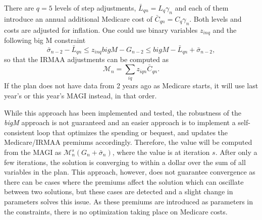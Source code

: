 \documentclass{report}[fleqn,12pt]
\begin{document}
\begin{description}[leftmargin=4em,style=multiline]
	There are $q=5$ levels
	of step adjustments, $\bar{L}_{qn} = L_q\gamma_n$ and each of them introduce
	an annual additional Medicare
	cost of $\bar{C}_{qn} = C_q\gamma_n$. Both levels and costs are adjusted for inflation.
	One could use binary variables $z_{inq}$ and the following big M constraint
	\begin{equation}
		\bar{\sigma}_{n-2} -\bar{L}_{qn} \le z_{inq} bigM - G_{n-2} \le bigM - \bar{L}_{qn} + \bar{\sigma}_{n-2},
	\end{equation}
	so that the IRMAA adjustments can be computed as
	\begin{equation}
		\label{Eq:IRMAA}
		\mathcal{M}_n = \sum_{iq} z_{iqn} \bar{C}_{qn}.
	\end{equation}
	If the plan does not have data from 2 years ago as Medicare starts,
	it will use last year's or this year's MAGI instead, in that order.

	While this approach has been implemented and tested, the robustness of the {\em bigM} approach
	is not guaranteed and an easier approach is to implement a self-consistent loop that
	optimizes the spending or bequest, and updates the Medicare/IRMAA premiums accordingly.
	Therefore, the value will be computed from the MAGI as $\mathcal{M}_n^s(G_n + \bar{\sigma}_n)$,
	where the value is at iteration $s$.
	After only a few iterations, the solution is converging to within a dollar over the
	sum of all variables in the plan. This approach, however, does not guarantee convergence
	as there can be cases where the premiums affect the solution which can oscillate between
	two solutions, but these cases are detected and a slight change in parameters
	solves this issue. As these premiums are introduced as parameters in the constraints,
	there is no optimization taking place on Medicare costs.
\end{description}
\end{document}
